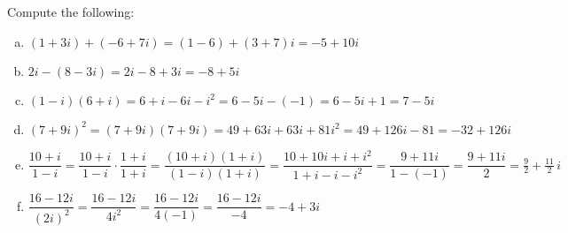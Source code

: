 \documentclass[11pt,letterpaper]{article}
\begin{document}
 Compute the following:
\begin{enumerate}[(a)]
\item $(1 + 3i) + (-6 + 7i)= (1 - 6) + (3 + 7)i= -5 + 10i$ \vfill
\item $2i - (8 - 3i)= 2i - 8 + 3i= -8 + 5i$ \vfill
\item $(1 - i)(6 + i)= 6 + i - 6i - i^2= 6 - 5i - (-1)= 6 - 5i + 1= 7 - 5i$ \vfill
\item $(7 + 9i)^2= (7 + 9i)(7 + 9i)= 49 + 63i + 63i + 81i^2= 49 + 126i - 81= -32 + 126i$ \vfill
\item $\dfrac{10 + i}{1 - i}= \dfrac{10 + i}{1 - i} \cdot \dfrac{1 + i}{1 + i}= \dfrac{(10 + i)(1 + i)}{(1 - i)(1 + i)}= \dfrac{10+10i + i + i^2}{1 + i - i - i^2}= \dfrac{9 + 11i}{1 - (-1)}= \dfrac{9 +11i}{2}= \frac{9}{2} + \frac{11}{2}\,i$ \vfill
\item $\dfrac{16 - 12i}{(2i)^2}= \dfrac{16 - 12i}{4i^2}= \dfrac{16 - 12i}{4(-1)}= \dfrac{16 - 12i}{-4}= -4 + 3i$ \vfill
\end{enumerate}


\end{document}
